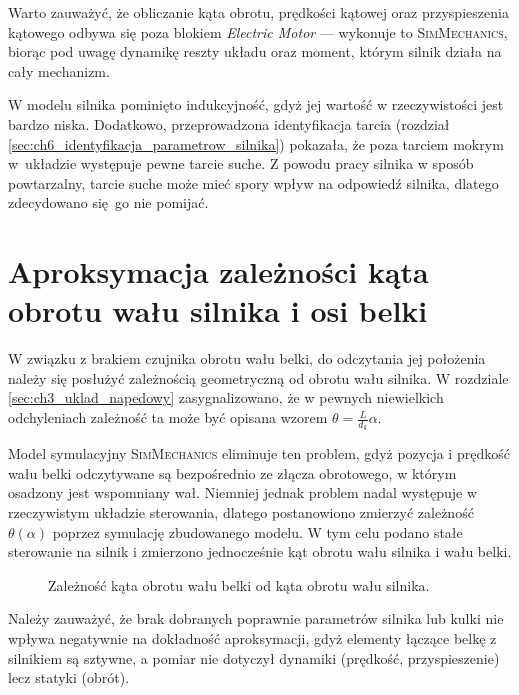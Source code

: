 Warto zauważyć, że obliczanie kąta obrotu, prędkości kątowej oraz przyspieszenia kątowego odbywa się poza blokiem \textit{Electric Motor} --- wykonuje to \textsc{SimMechanics}, biorąc pod uwagę dynamikę reszty układu oraz moment, którym silnik działa na cały mechanizm.

W modelu silnika pominięto indukcyjność, gdyż jej wartość w rzeczywistości jest bardzo niska. Dodatkowo, przeprowadzona identyfikacja tarcia (rozdział \ref{sec:ch6_identyfikacja_parametrow_silnika}) pokazała, że poza tarciem mokrym w~układzie występuje pewne tarcie suche. Z powodu pracy silnika w sposób powtarzalny, tarcie suche może mieć spory wpływ na odpowiedź silnika, dlatego zdecydowano się go nie pomijać.

\section{Aproksymacja zależności kąta obrotu wału silnika i osi belki}
\label{sec:ch4_zaleznosc_kata_silnika_i_kata_belki}

W związku z brakiem czujnika obrotu wału belki, do odczytania jej położenia należy się posłużyć zależnością geometryczną od obrotu wału silnika. W rozdziale \ref{sec:ch3_uklad_napedowy} zasygnalizowano, że w pewnych niewielkich odchyleniach zależność ta może być opisana wzorem $\theta = \frac{L}{d_k} \alpha$.

Model symulacyjny \textsc{SimMechanics} eliminuje ten problem, gdyż pozycja i prędkość wału belki odczytywane są bezpośrednio ze złącza obrotowego, w którym osadzony jest wspomniany wał. Niemniej jednak problem nadal występuje w rzeczywistym układzie sterowania, dlatego postanowiono zmierzyć zależność $\theta(\alpha)$ poprzez symulację zbudowanego modelu. W tym celu podano stałe sterowanie na silnik i zmierzono jednocześnie kąt obrotu wału silnika i wału belki.

\begin{figure}[h]
    \centering
    
    \caption{Zależność kąta obrotu wału belki od kąta obrotu wału silnika.}
    \label{fig:zaleznosc_kata_belki_od_enkodera}
\end{figure}

Należy zauważyć, że brak dobranych poprawnie parametrów silnika lub kulki nie wpływa negatywnie na dokładność aproksymacji, gdyż elementy łączące belkę z silnikiem są sztywne, a pomiar nie dotyczył dynamiki (prędkość, przyspieszenie) lecz statyki (obrót).

